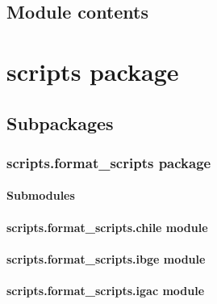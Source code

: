 \documentclass[letterpaper,10pt,english]{sphinxmanual}
\begin{document}
\subsection{Module contents}
\label{\detokenize{parallel_gamit:module-parallel_gamit}}\label{\detokenize{parallel_gamit:module-contents}}
\sphinxstepscope


\section{scripts package}
\label{\detokenize{scripts:scripts-package}}\label{\detokenize{scripts::doc}}

\subsection{Subpackages}
\label{\detokenize{scripts:subpackages}}
\sphinxstepscope


\subsubsection{scripts.format\_scripts package}
\label{\detokenize{scripts.format_scripts:scripts-format-scripts-package}}\label{\detokenize{scripts.format_scripts::doc}}

\paragraph{Submodules}
\label{\detokenize{scripts.format_scripts:submodules}}

\paragraph{scripts.format\_scripts.chile module}
\label{\detokenize{scripts.format_scripts:scripts-format-scripts-chile-module}}

\paragraph{scripts.format\_scripts.ibge module}
\label{\detokenize{scripts.format_scripts:scripts-format-scripts-ibge-module}}

\paragraph{scripts.format\_scripts.igac module}
\label{\detokenize{scripts.format_scripts:scripts-format-scripts-igac-module}}
\end{document}
